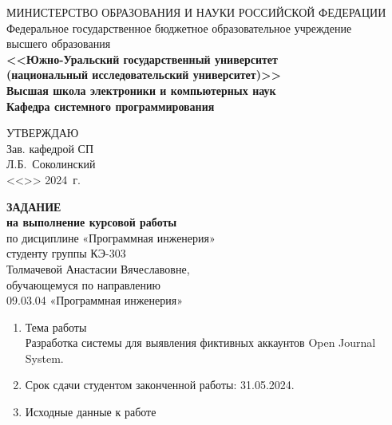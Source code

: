 \newpage
\thispagestyle{empty}

\begin{adjustwidth}{-1.5cm}{0.5cm}
\begin{linespread}{1}
\begin{center}


\small{
МИНИСТЕРСТВО ОБРАЗОВАНИЯ И НАУКИ РОССИЙСКОЙ ФЕДЕРАЦИИ\\
Федеральное государственное бюджетное образовательное учреждение\\
высшего образования\\
\textbf{<<Южно-Уральский государственный университет\\
(национальный исследовательский университет)>>\\
Высшая школа электроники и компьютерных наук\\
Кафедра системного программирования}
}



\vspace{2em}

\hfill{}
\parbox{7cm}{
УТВЕРЖДАЮ \\
Зав. кафедрой СП \\[0.5em]
\underfield{} Л.Б.~Соколинский \\[0.5em]
<<\underline{\qquad}>>\underfield{} 2024~г.}

\vspace{2.5em}

\textbf{ЗАДАНИЕ} \\
\textbf{на выполнение курсовой работы}\\
по дисциплине «Программная инженерия»\\
студенту группы КЭ-303\\
Толмачевой Анастасии Вячеславовне,\\
обучающемуся по направлению\\
09.03.04 «Программная инженерия»

\end{center}

\vspace{1.5em}

{
\small
\begin{enumerate}[itemsep=0cm, parsep=0cm]
	\bf\item Тема работы \rm
	\\
	Разработка системы для выявления фиктивных аккаунтов Open Journal System.

	\bf\item Срок сдачи студентом законченной работы: \rm
	31.05.2024.
        \vspace{0.2em}
	\bf\item Исходные данные к работе\rm
	\begin{enumerate}[itemindent=0.9cm, leftmargin=-0.6cm, itemsep=0cm, parsep=0cm, after=\vspace{-0.05cm}, before=\vspace{-0.05cm}]
		\raggedright
  

\end{enumerate}
\end{enumerate}}
\end{linespread}
\end{adjustwidth}
